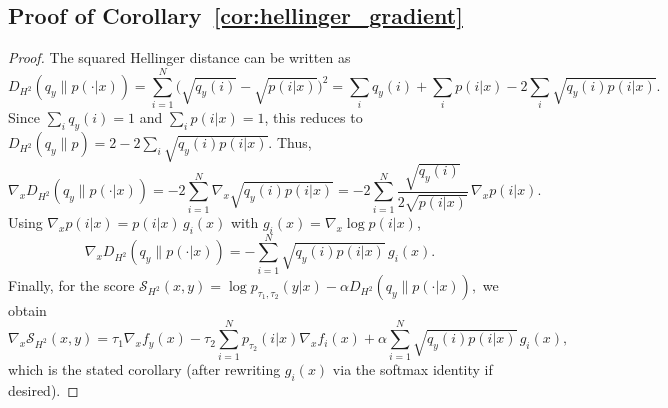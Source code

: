 \documentclass{article}
\begin{document}
\subsection{Proof of Corollary~\ref{cor:hellinger_gradient}}
\label{app:proof_hellinger}
\begin{proof}
The squared Hellinger distance can be written as
\begin{equation}
D_{H^2}(q_y\|p(\cdot|x))
=
\sum_{i=1}^N \big(\sqrt{q_y(i)}-\sqrt{p(i|x)}\big)^2
=
\sum_i q_y(i) + \sum_i p(i|x) - 2\sum_i \sqrt{q_y(i)p(i|x)}.
\end{equation}
Since $\sum_i q_y(i)=1$ and $\sum_i p(i|x)=1$, this reduces to
\(
D_{H^2}(q_y\|p)=2-2\sum_i \sqrt{q_y(i)p(i|x)}.
\)
Thus,
\begin{equation}
\nabla_x D_{H^2}(q_y\|p(\cdot|x))
=
-2\sum_{i=1}^N \nabla_x \sqrt{q_y(i)p(i|x)}
=
-2\sum_{i=1}^N \frac{\sqrt{q_y(i)}}{2\sqrt{p(i|x)}}\,\nabla_x p(i|x).
\end{equation}
Using $\nabla_x p(i|x)=p(i|x)\,g_i(x)$ with $g_i(x)=\nabla_x\log p(i|x)$,
\begin{equation}
\nabla_x D_{H^2}(q_y\|p(\cdot|x))
=
-\sum_{i=1}^N \sqrt{q_y(i)p(i|x)}\, g_i(x).
\end{equation}
Finally, for the score
\(
\mathcal{S}_{H^2}(x,y)=\log p_{\tau_1,\tau_2}(y|x)-\alpha D_{H^2}(q_y\|p(\cdot|x)),
\)
we obtain
\begin{equation}
\nabla_x \mathcal{S}_{H^2}(x,y)
=
\tau_1 \nabla_x f_y(x)
-\tau_2 \sum_{i=1}^N p_{\tau_2}(i|x)\nabla_x f_i(x)
+\alpha \sum_{i=1}^N \sqrt{q_y(i)p(i|x)}\, g_i(x),
\end{equation}
which is the stated corollary (after rewriting $g_i(x)$ via the softmax identity if desired).
\end{proof}



\end{document}
